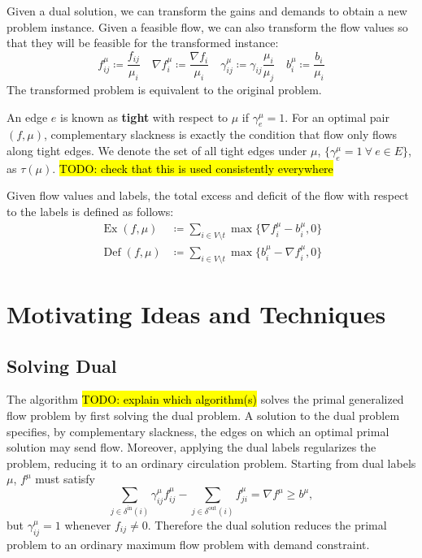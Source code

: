 \documentclass[11pt]{article}
\theoremstyle{definition}
\theoremstyle{definition}
\newcommand{\fu}{f^{\mu}}
\newcommand{\nfiu}{\nabla \fu_i}
\newcommand{\biu}{b_{i}^{\mu}}
\newcommand{\geu}{\gamma_e^{\mu}}
\newcommand{\giij}{\gamma_{ij}^{\mu}}
\newcommand{\din}{\delta^{\text{in}}}
\newcommand{\dout}{\delta^{\text{out}}}
\DeclareMathOperator{\Ex}{Ex}
\DeclareMathOperator{\Def}{Def}
\newcommand{\todo}[1]{\hl{TODO: #1}}
\begin{document}
	Given a dual solution, we can transform the gains and demands to obtain a new
	problem instance. Given a feasible flow, we can also transform the flow values
	so that they will be feasible for the transformed instance:
	\[ f_{ij}^\mu \coloneqq \frac{f_{ij}}{\mu_i} \quad
	\nabla f_i^\mu \coloneqq \frac{\nabla f_i }{\mu_i} \quad
	\gamma_{ij}^\mu \coloneqq \gamma_{ij} \frac{\mu_i}{\mu_j} \quad
	b_i^\mu \coloneqq \frac{b_i}{\mu_i} \]
	The transformed problem is equivalent to the original problem.
	
	An edge $e$ is known as \textbf{tight} with respect to $\mu$ if $\gamma_e^\mu =1$.
	For an optimal pair $(f, \mu)$, complementary slackness is exactly the condition that
	flow only flows along tight edges. We denote the set of all tight edges under
	$\mu$, $\{\geu = 1\ \forall\ e  \in E\}$, as $\tau(\mu)$. \todo{check that
	this is used consistently everywhere}
	
	Given flow values and labels, the total excess and deficit of the flow with respect
	to the labels is defined as follows:
	\begin{align*}
	\Ex(f,\mu)  &\coloneqq \sum_{i \in V \setminus t} \max \{ \nfiu - \biu, 0 \} \\
	\Def(f,\mu) &\coloneqq \sum_{i \in V \setminus t} \max \{ \biu - \nfiu, 0 \}
	\end{align*}
  
\section{Motivating Ideas and Techniques}
	\subsection{Solving Dual}
            
	The algorithm \todo{explain which algorithm(s)} solves the primal generalized flow problem by first solving the dual problem.
    A solution to the dual problem specifies, by complementary slackness, the edges on which an optimal
    primal solution may send flow. Moreover, applying the dual labels regularizes the problem, reducing
    it to an ordinary circulation problem. Starting from dual labels $\mu$, $f^{\mu}$ must satisfy
    \[ \sum_{j \in \din(i)} \giij \fu_{ij} - \sum_{j \in \dout(i)} \fu_{ji}
     = \nabla f^{\mu} \geq b^{\mu}, \]
    but $\giij = 1$ whenever $f_{ij} \neq 0$. Therefore the dual solution reduces the primal problem
    to an ordinary maximum flow problem with demand constraint.
    
\end{document}
